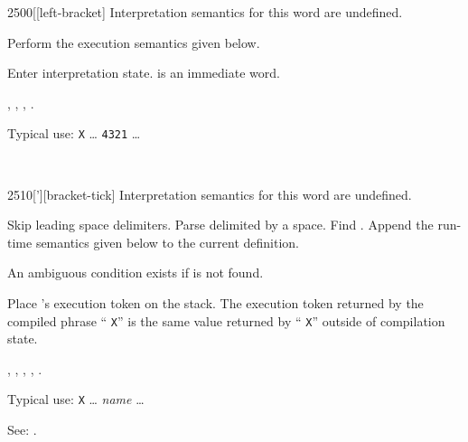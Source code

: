 \begin{worddef}{2500}{[}[left-bracket]
\interpret
	Interpretation semantics for this word are undefined.

\compile
	Perform the execution semantics given below.

\execute
	\stack{}{}

	Enter interpretation state. \word{[} is an immediate word.

\see {},
	,
	\wref{core:]}{]},
	\rref{core:[}{}.

	\begin{rationale} %
		Typical use:
			\word{:} \texttt{X} {\ldots}
				\word{[} \texttt{4321} \word{]} 
				{\ldots} \word{;}
	\end{rationale}

	\begin{testing} %
		 \\
	\end{testing}
\end{worddef}


\begin{worddef}{2510}{[']}[bracket-tick]
\interpret
	Interpretation semantics for this word are undefined.

\compile

	Skip leading space delimiters. Parse  delimited by
	a space. Find . Append the run-time semantics given
	below to the current definition.

	An ambiguous condition exists if  is not found.

\runtime

	Place 's execution token  on the stack.
	The execution token returned by the compiled phrase
	``\word{[']} \texttt{X}'' is the same value returned by
	`` \texttt{X}'' outside of compilation state.

\see {},
	,
	,
	,
	.

	\begin{rationale} %
		Typical use:
			\word{:} \texttt{X} {\ldots}
				\word{[']} \emph{name}
				{\ldots} \word{;}

		See:
			.
	\end{rationale}

	\begin{testing} %
		 \\
	\end{testing}
\end{worddef}


